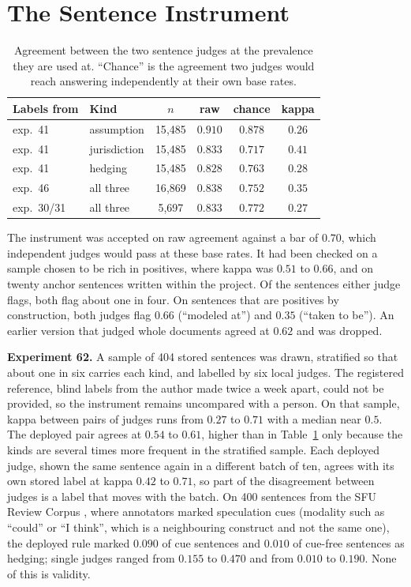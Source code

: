 \documentclass[10pt,twocolumn]{article}
\begin{document}
\section{The Sentence Instrument}
\label{app:instruments}

\begin{table}[h]
\centering\footnotesize
\setlength{\tabcolsep}{3.5pt}
\begin{tabular}{llcccc}
\toprule
Labels from & Kind & $n$ & raw & chance & kappa \\
\midrule
exp.\ 41 & assumption & 15{,}485 & $0.910$ & $0.878$ & $0.26$ \\
exp.\ 41 & jurisdiction & 15{,}485 & $0.833$ & $0.717$ & $0.41$ \\
exp.\ 41 & hedging & 15{,}485 & $0.828$ & $0.763$ & $0.28$ \\
exp.\ 46 & all three & 16{,}869 & $0.838$ & $0.752$ & $0.35$ \\
exp.\ 30/31 & all three & 5{,}697 & $0.833$ & $0.772$ & $0.27$ \\
\bottomrule
\end{tabular}
\caption{Agreement between the two sentence judges at the prevalence
they are used at. ``Chance'' is the agreement two judges would reach
answering independently at their own base rates.}
\label{tab:kappa}
\end{table}

The instrument was accepted on raw agreement against a bar of $0.70$,
which independent judges would pass at these base rates. It had been
checked on a sample chosen to be rich in positives, where kappa was
$0.51$ to $0.66$, and on twenty anchor sentences written within the
project. Of the sentences either judge flags, both flag about one in
four. On sentences that are positives by construction, both judges
flag $0.66$ (``modeled at'') and $0.35$ (``taken to be''). An earlier
version that judged whole documents agreed at $0.62$ and was dropped.

\textbf{Experiment 62.} A sample of 404 stored sentences was drawn,
stratified so that about one in six carries each kind, and labelled by
six local judges. The registered reference, blind labels from the
author made twice a week apart, could not be provided, so the
instrument remains uncompared with a person. On that sample, kappa
between pairs of judges runs from $0.27$ to $0.71$ with a median near
$0.5$. The deployed pair agrees at $0.54$ to $0.61$, higher than in
Table~\ref{tab:kappa} only because the kinds are several times more
frequent in the stratified sample. Each deployed judge, shown the same
sentence again in a different batch of ten, agrees with its own stored
label at kappa $0.42$ to $0.71$, so part of the disagreement between
judges is a label that moves with the batch. On 400 sentences from the
SFU Review Corpus \cite{konstantinova2012sfu}, where annotators marked
speculation cues (modality such as ``could'' or ``I think'', which is
a neighbouring construct and not the same one), the deployed rule
marked $0.090$ of cue sentences and $0.010$ of cue-free sentences as
hedging; single judges ranged from $0.155$ to $0.470$ and from $0.010$
to $0.190$. None of this is validity.
\end{document}
